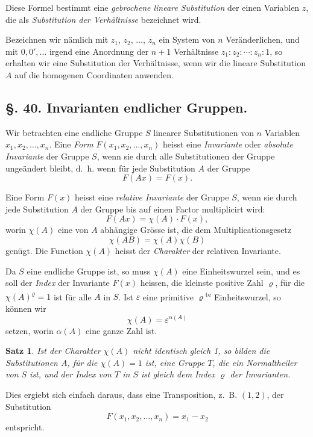 \documentclass[12pt,a4paper]{article}
\theoremstyle{plain}
\newtheorem{satz}{Satz}[section]
\theoremstyle{definition}
\theoremstyle{remark}
\begin{document}
Diese Formel bestimmt eine \emph{gebrochene lineare Substitution} der einen Variablen $z$, die als \emph{Substitution der Verhältnisse} bezeichnet wird.

Bezeichnen wir nämlich mit $z_{1}$, $z_{2}$, $\ldots$, $z_{n}$ ein System von $n$ Veränderlichen, und mit $0, 0', \ldots$ irgend eine Anordnung der $n+1$ Verhältnisse $z_{1}:z_{2}:\cdots:z_{n}:1$, so erhalten wir eine Substitution der Verhältnisse, wenn wir die lineare Substitution $A$ auf die homogenen Coordinaten anwenden.


\subsection*{\S. 40. Invarianten endlicher Gruppen.}

Wir betrachten eine endliche Gruppe $S$ linearer Substitutionen von $n$ Variablen $x_{1}, x_{2}, \ldots, x_{n}$. Eine \emph{Form} $F(x_{1}, x_{2}, \ldots, x_{n})$ heisst eine \emph{Invariante} oder \emph{absolute Invariante} der Gruppe $S$, wenn sie durch alle Substitutionen der Gruppe ungeändert bleibt, d.~h. wenn für jede Substitution $A$ der Gruppe
\[
F(Ax) = F(x).
\]

Eine Form $F(x)$ heisst eine \emph{relative Invariante} der Gruppe $S$, wenn sie durch jede Substitution $A$ der Gruppe bis auf einen Factor multiplicirt wird:
\[
F(Ax) = \chi(A) \cdot F(x),
\]
worin $\chi(A)$ eine von $A$ abhängige Grösse ist, die dem Multiplicationsgesetz
\[
\chi(AB) = \chi(A)\chi(B)
\]
genügt. Die Function $\chi(A)$ heisst der \emph{Charakter} der relativen Invariante.

Da $S$ eine endliche Gruppe ist, so muss $\chi(A)$ eine Einheitswurzel sein, und es soll der \emph{Index} der Invariante $F(x)$ heissen, die kleinste positive Zahl $\varrho$, für die $\chi(A)^{\varrho} = 1$ ist für alle $A$ in $S$. Ist $\varepsilon$ eine primitive $\varrho$\textsuperscript{te} Einheitswurzel, so können wir
\[
\chi(A) = \varepsilon^{\alpha(A)}
\]
setzen, worin $\alpha(A)$ eine ganze Zahl ist.

\begin{satz}
Ist der Charakter $\chi(A)$ nicht identisch gleich 1, so bilden die Substitutionen $A$, für die $\chi(A) = 1$ ist, eine Gruppe $T$, die ein Normaltheiler von $S$ ist, und der Index von $T$ in $S$ ist gleich dem Index $\varrho$ der Invarianten.
\end{satz}

Dies ergiebt sich einfach daraus, dass eine Transposition, z.~B. $(1,2)$, der Substitution
\[
F(x_{1}, x_{2}, \ldots, x_{n}) = x_{1} - x_{2}
\]
entspricht.
\end{document}
